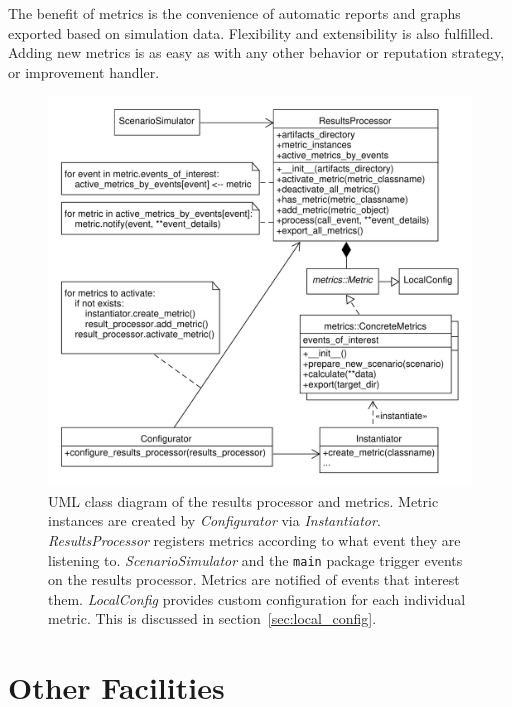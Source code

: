 \documentclass[%
    ]{\PathToTumTemplate/thesis/tum_thesis}
\begin{document}
The benefit of metrics is the convenience of automatic reports and graphs exported based on simulation data.
Flexibility and extensibility is also fulfilled.
Adding new metrics is as easy as with any other behavior or reputation strategy, or improvement handler.

\begin{figure}[tbp]
  \begin{center}
        \includegraphics[width=1\linewidth]	{../uml/reproc_metrics.pdf}
    \caption{
	UML class diagram of the results processor and metrics.
	Metric instances are created by \emph{Configurator} via \emph{Instantiator}.
	\emph{ResultsProcessor} registers metrics according to what event they are listening to.
	\emph{ScenarioSimulator} and the \lstinline{main} package trigger events on the results processor.
	Metrics are notified of events that interest them.
	\emph{LocalConfig} provides custom configuration for each individual metric.
	This is discussed in section~\ref{sec:local_config}.
    }
    \label{fig:reproc_metrics}
  \end{center}
\end{figure}



\section{Other Facilities}\label{sec:impl_misc}
\end{document}
